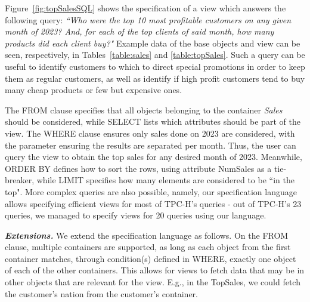 \documentclass[sigplan,10pt]{acmart}
\newcommand{\qcr}[1]{{\fontfamily{qcr}\selectfont #1}}
\begin{document}
Figure~\ref{fig:topSalesSQL} shows the specification of a view which answers the following query: \emph{``Who were the top 10 most profitable customers on any given month of 2023? And, for each of the top clients of said month, how many products did each client buy?"}
Example data of the base objects and view can be seen, respectively, in Tables~\ref{table:sales} and \ref{table:topSales}.
Such a query can be useful to identify customers to which to direct special promotions in order to keep them as regular customers, as well as identify if high profit customers tend to buy many cheap products or few but expensive ones.

The \qcr{FROM} clause specifies that all objects belonging to the container \emph{Sales} should be considered, while \qcr{SELECT} lists which attributes should be part of the view.
The \qcr{WHERE} clause ensures only sales done on 2023 are considered, with the parameter \qcr{[MONTH]} ensuring the results are separated per month.
Thus, the user can query the view to obtain the top sales for any desired month of 2023.
Meanwhile, \qcr{ORDER BY} defines how to sort the rows, using attribute \qcr{NumSales} as a tie-breaker, while \qcr{LIMIT} specifies how many elements are considered to be ``in the top".
More complex queries are also possible, namely, our specification language allows specifying efficient views for most of TPC-H's queries - out of TPC-H's 23 queries, we managed to specify views for 20 queries using our language.

\emph{\textbf{Extensions.}} We extend the specification language as follows.
On the \qcr{FROM} clause, multiple containers are supported, as long as each object from the first container matches, through condition(s) defined in \qcr{WHERE}, exactly one object of each of the other containers.
This allows for views to fetch data that may be in other objects that are relevant for the view.
E.g., in the TopSales, we could fetch the customer's nation from the customer's container.
\end{document}

